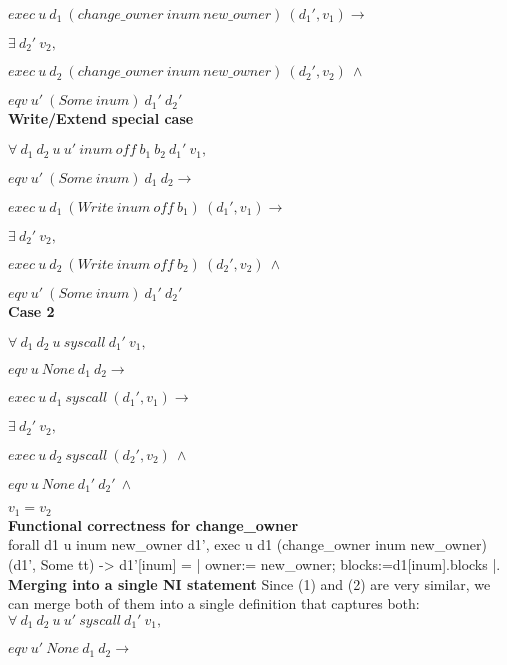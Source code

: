 \documentclass[onecolumn]{paper}
\begin{document}
			$exec\ u\ d_1\ (change\_owner\ inum\ new\_owner)\ (d_1', v_1) \rightarrow$
			
			$\exists\ d_2'\ v_2,$
			
			$exec\ u\ d_2\ (change\_owner\ inum\ new\_owner)\ (d_2', v_2)\ \wedge$
			
			$eqv\ u'\ (Some\ inum)\ d_1'\ d_2'$\\
			
			
			{\bf Write/Extend special case}
			
			$\forall\ d_1\ d_2\ u\ u'\ inum\ off\ b_1\ b_2\ d_1'\ v_1,$
			
			$eqv\ u'\ (Some\ inum)\ d_1\ d_2 \rightarrow$
			
			$exec\ u\ d_1\ (Write\ inum\ off\ b_1)\ (d_1', v_1) \rightarrow$
			
			$\exists\ d_2'\ v_2,$
			
			$exec\ u\ d_2\ (Write\ inum\ off\ b_2)\ (d_2', v_2)\ \wedge$
			
			$eqv\ u'\ (Some\ inum)\ d_1'\ d_2'$\\
			
			{\bf Case 2}
			 
			 $\forall\ d_1\ d_2\ u\ syscall\ d_1'\ v_1,$
			 
			 $eqv\ u\ None\ d_1\ d_2 \rightarrow$
			 
			 $exec\ u\ d_1\ syscall\ (d_1', v_1) \rightarrow$
			 
			 $\exists\ d_2'\ v_2,$
			 
			 $exec\ u\ d_2\ syscall\ (d_2', v_2)\ \wedge$
			 
			 $eqv\ u\ None\ d_1'\ d_2'\ \wedge$
			 
			 $v_1 = v_2$\\
			
			
			{\bf Functional correctness for change\_owner}\\
			forall d1 u inum new\_owner d1',
			exec u d1 (change\_owner inum new\_owner) (d1', Some tt) ->
			d1'[inum] = {| owner:= new\_owner; blocks:=d1[inum].blocks |}.\\
			
			
			
			{\bf Merging into a single NI statement}
			Since (1) and (2) are very similar, we can merge both of them into a single definition that captures both:\\
			
			$\forall\ d_1\ d_2\ u\ u'\ syscall\ d_1'\ v_1,$
			
			$eqv\ u'\ None\ d_1\ d_2 \rightarrow$
			
\end{document}
